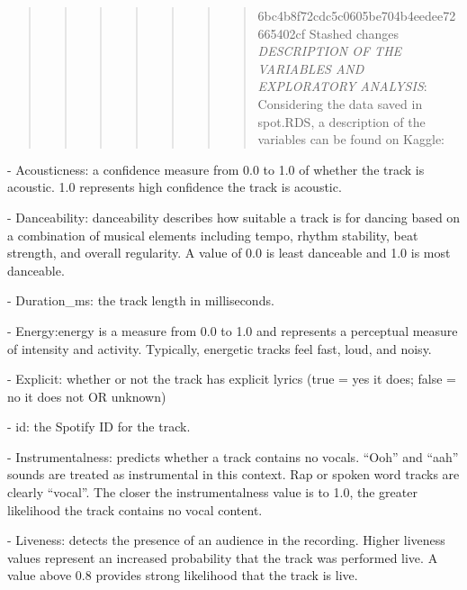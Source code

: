 \documentclass[
]{article}
\begin{document}
\begin{quote}
\begin{quote}
\begin{quote}
\begin{quote}
\begin{quote}
\begin{quote}
\begin{quote}
6bc4b8f72cdc5c0605be704b4eedee72665402cf Stashed changes
\emph{DESCRIPTION OF THE VARIABLES AND EXPLORATORY ANALYSIS}:
Considering the data saved in spot.RDS, a description of the variables
can be found on Kaggle:
\end{quote}
\end{quote}
\end{quote}
\end{quote}
\end{quote}
\end{quote}
\end{quote}

- Acousticness: a confidence measure from 0.0 to 1.0 of whether the
track is acoustic. 1.0 represents high confidence the track is acoustic.

- Danceability: danceability describes how suitable a track is for
dancing based on a combination of musical elements including tempo,
rhythm stability, beat strength, and overall regularity. A value of 0.0
is least danceable and 1.0 is most danceable.

- Duration\_ms: the track length in milliseconds.

- Energy:energy is a measure from 0.0 to 1.0 and represents a perceptual
measure of intensity and activity. Typically, energetic tracks feel
fast, loud, and noisy.

- Explicit: whether or not the track has explicit lyrics (true = yes it
does; false = no it does not OR unknown)

- id: the Spotify ID for the track.

- Instrumentalness: predicts whether a track contains no vocals. ``Ooh''
and ``aah'' sounds are treated as instrumental in this context. Rap or
spoken word tracks are clearly ``vocal''. The closer the
instrumentalness value is to 1.0, the greater likelihood the track
contains no vocal content.

- Liveness: detects the presence of an audience in the recording. Higher
liveness values represent an increased probability that the track was
performed live. A value above 0.8 provides strong likelihood that the
track is live.
\end{document}
